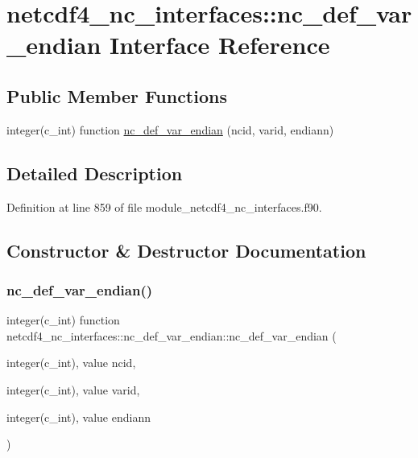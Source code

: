 \hypertarget{interfacenetcdf4__nc__interfaces_1_1nc__def__var__endian}{}\section{netcdf4\+\_\+nc\+\_\+interfaces\+:\+:nc\+\_\+def\+\_\+var\+\_\+endian Interface Reference}
\label{interfacenetcdf4__nc__interfaces_1_1nc__def__var__endian}
\subsection*{Public Member Functions}
\begin{DoxyCompactItemize}
\item 
integer(c\+\_\+int) function \hyperlink{interfacenetcdf4__nc__interfaces_1_1nc__def__var__endian_ae716d96ac1dc15ff8caebbd17cf117c4}{nc\+\_\+def\+\_\+var\+\_\+endian} (ncid, varid, endiann)
\end{DoxyCompactItemize}


\subsection{Detailed Description}


Definition at line 859 of file module\+\_\+netcdf4\+\_\+nc\+\_\+interfaces.\+f90.



\subsection{Constructor \& Destructor Documentation}
\mbox{\label{interfacenetcdf4__nc__interfaces_1_1nc__def__var__endian_ae716d96ac1dc15ff8caebbd17cf117c4}} 
\subsubsection{\texorpdfstring{nc\+\_\+def\+\_\+var\+\_\+endian()}{nc\_def\_var\_endian()}}
{\footnotesize\ttfamily integer(c\+\_\+int) function netcdf4\+\_\+nc\+\_\+interfaces\+::nc\+\_\+def\+\_\+var\+\_\+endian\+::nc\+\_\+def\+\_\+var\+\_\+endian (\begin{DoxyParamCaption}\item[{integer(c\+\_\+int), value}]{ncid,  }\item[{integer(c\+\_\+int), value}]{varid,  }\item[{integer(c\+\_\+int), value}]{endiann }\end{DoxyParamCaption})}



